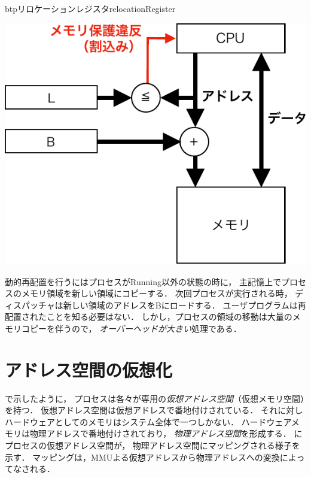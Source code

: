 \begin{myfig}{btp}{リロケーションレジスタ}{relocationRegister}
\begin{minipage}{0.49\columnwidth}
\begin{center}
      \includegraphics[scale=0.6]{Fig/relocationHardware-crop.pdf}
      \label{fig:relocationHardware}
    \end{center}
  \end{minipage}
\end{myfig}

動的再配置を行うにはプロセスがRunning以外の状態の時に，
主記憶上でプロセスのメモリ領域を新しい領域にコピーする．
次回プロセスが実行される時，
ディスパッチャは新しい領域のアドレスをBにロードする．
ユーザプログラムは再配置されたことを知る必要はない．
しかし，プロセスの領域の移動は大量のメモリコピーを伴うので，
\emph{オーバーヘッドが大きい}処理である．

\section{アドレス空間の仮想化}
で示したように，
プロセスは各々が専用の\emph{仮想アドレス空間}（仮想メモリ空間）を持つ．
仮想アドレス空間は仮想アドレスで番地付けされている．
それに対しハードウェアとしてのメモリはシステム全体で一つしかない．
ハードウェアメモリは物理アドレスで番地付けされており，
\emph{物理アドレス空間}を形成する．
にプロセスの仮想アドレス空間が，
物理アドレス空間にマッピングされる様子を示す．
マッピングは，MMUよる仮想アドレスから物理アドレスへの変換によってなされる．

